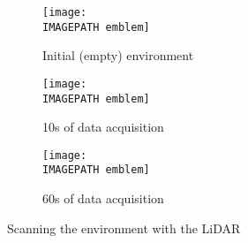 \begin{figure}
	\centering
	\begin{subfigure}[b]{0.4\textwidth}
		\texttt{[image: \\IMAGEPATH emblem]}
		\caption{Initial (empty) environment}
		\label{fig:scaninit}
	\end{subfigure}
	
	\begin{subfigure}[b]{0.4\textwidth}
		\texttt{[image: \\IMAGEPATH emblem]}
		\caption{10s of data acquisition}
		\label{fig:scanten}
	\end{subfigure}
	
	\begin{subfigure}[b]{0.4\textwidth}
		\texttt{[image: \\IMAGEPATH emblem]}
		\caption{60s of data acquisition}
		\label{fig:scanminute}
	\end{subfigure}
	\caption{Scanning the environment with the LiDAR}
	\label{fig:scan}
\end{figure}